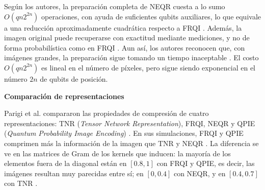 Según los autores, la preparación completa de NEQR cuesta a lo sumo $O(q n 2^{2n})$ operaciones, con ayuda de suficientes qubits auxiliares, lo que equivale a una reducción aproximadamente cuadrática respecto a FRQI \cite{Zhang2013NEQR}.
Además, la imagen original puede recuperarse con exactitud mediante mediciones, y no de forma probabilística como en FRQI \cite{Zhang2013NEQR}.
Aun así, los autores reconocen que, con imágenes grandes, la preparación sigue tomando un tiempo inaceptable \cite{Zhang2013NEQR}. El costo $O(q n 2^{2n})$ es lineal en el número de píxeles, pero sigue siendo exponencial en el número $2n$ de qubits de posición.

\textbf{Comparación de representaciones}

Parigi et al. compararon las propiedades de compresión de cuatro representaciones: TNR (\textit{Tensor Network Representation}), FRQI, NEQR y QPIE (\textit{Quantum Probability Image Encoding}) \cite{Parigi2026QImR}.
En sus simulaciones, FRQI y QPIE comprimen más la información de la imagen que TNR y NEQR \cite{Parigi2026QImR}.
La diferencia se ve en las matrices de Gram de los kernels que inducen: la mayoría de los elementos fuera de la diagonal están en $[0.8, 1]$ con FRQI y QPIE, es decir, las imágenes resultan muy parecidas entre sí; en $[0, 0.4]$ con NEQR, y en $[0.4, 0.7]$ con TNR \cite{Parigi2026QImR}.

